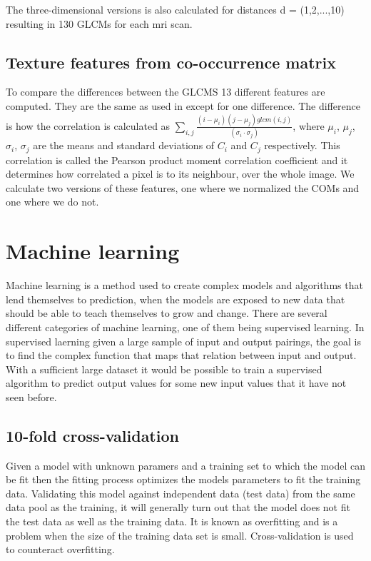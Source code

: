 The three-dimensional versions is also calculated for distances d = (1,2,...,10) resulting in 130 GLCMs for each mri scan.

\subsection{Texture features from co-occurrence matrix}
To compare the differences between the GLCMS 13 different features are computed. They are the same as used in \cite{MRfreeborough} except for one difference. The difference is how the correlation is calculated as $\sum_{i,j} \frac{(i-\mu_i)(j-\mu_j)glcm(i,j)}{(\sigma_i \cdot \sigma_j)}$, where $\mu_i$, $\mu_j$, $\sigma_i$, $\sigma_j$ are the means and standard deviations of $C_i$ and $C_j$ respectively. This correlation is called the Pearson product moment correlation coefficient and it determines how correlated a pixel is to its neighbour, over the whole image\cite{graycoprops}\cite{Pearson}. We calculate two versions of these features, one where we normalized the COMs and one where we do not.


\section{Machine learning}

Machine learning is a method used to create complex models and algorithms that lend themselves to prediction, when the models are exposed to new data that should be able to teach themselves to grow and change.
There are several different categories of machine learning, one of them being supervised learning. In supervised laerning given a large sample of input and output pairings, the goal is to find the complex function that maps that relation between input and output. With a sufficient large dataset it would be possible to train a supervised algorithm to predict output values for some new input values that it have not seen before.


\subsection{10-fold cross-validation}
Given a model with unknown paramers and a training set to which the model can be fit then the fitting process optimizes the models parameters to fit the training data. Validating this model against independent data (test data) from the same data pool as the training, it will generally turn out that the model does not fit the test data as well as the training data. It is known as overfitting and is a problem when the size of the training data set is small. Cross-validation is used to counteract overfitting.

